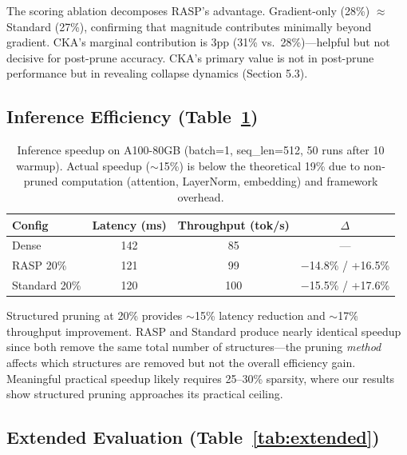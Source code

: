 \documentclass[11pt,a4paper]{article}
\begin{document}
The scoring ablation decomposes RASP's advantage. Gradient-only (28\%) $\approx$ Standard (27\%), confirming that magnitude contributes minimally beyond gradient. CKA's marginal contribution is 3pp (31\% vs.\ 28\%)---helpful but not decisive for post-prune accuracy. CKA's primary value is not in post-prune performance but in revealing collapse dynamics (Section 5.3).

\subsection{Inference Efficiency (Table~\ref{tab:speedup})}

\begin{table}[t]
\centering
\small
\begin{tabular}{lccc}
\toprule
\textbf{Config} & \textbf{Latency (ms)} & \textbf{Throughput (tok/s)} & \textbf{$\Delta$} \\
\midrule
Dense & 142 & 85 & --- \\
RASP 20\% & 121 & 99 & $-$14.8\% / +16.5\% \\
Standard 20\% & 120 & 100 & $-$15.5\% / +17.6\% \\
\bottomrule
\end{tabular}
\caption{Inference speedup on A100-80GB (batch=1, seq\_len=512, 50 runs after 10 warmup). Actual speedup ($\sim$15\%) is below the theoretical 19\% due to non-pruned computation (attention, LayerNorm, embedding) and framework overhead.}
\label{tab:speedup}
\end{table}

Structured pruning at 20\% provides $\sim$15\% latency reduction and $\sim$17\% throughput improvement. RASP and Standard produce nearly identical speedup since both remove the same total number of structures---the pruning \emph{method} affects which structures are removed but not the overall efficiency gain. Meaningful practical speedup likely requires 25--30\% sparsity, where our results show structured pruning approaches its practical ceiling.

\subsection{Extended Evaluation (Table~\ref{tab:extended})}
\end{document}
